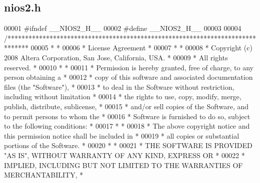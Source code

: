\subsection{nios2.\+h}
\label{nios2_8h_source}

\begin{DoxyCode}
00001 \textcolor{preprocessor}{#ifndef \_\_NIOS2\_H\_\_}
00002 \textcolor{preprocessor}{#define \_\_NIOS2\_H\_\_}
00003 
00004 \textcolor{comment}{/******************************************************************************}
00005 \textcolor{comment}{*                                                                             *}
00006 \textcolor{comment}{* License Agreement                                                           *}
00007 \textcolor{comment}{*                                                                             *}
00008 \textcolor{comment}{* Copyright (c) 2008 Altera Corporation, San Jose, California, USA.           *}
00009 \textcolor{comment}{* All rights reserved.                                                        *}
00010 \textcolor{comment}{*                                                                             *}
00011 \textcolor{comment}{* Permission is hereby granted, free of charge, to any person obtaining a     *}
00012 \textcolor{comment}{* copy of this software and associated documentation files (the "Software"),  *}
00013 \textcolor{comment}{* to deal in the Software without restriction, including without limitation   *}
00014 \textcolor{comment}{* the rights to use, copy, modify, merge, publish, distribute, sublicense,    *}
00015 \textcolor{comment}{* and/or sell copies of the Software, and to permit persons to whom the       *}
00016 \textcolor{comment}{* Software is furnished to do so, subject to the following conditions:        *}
00017 \textcolor{comment}{*                                                                             *}
00018 \textcolor{comment}{* The above copyright notice and this permission notice shall be included in  *}
00019 \textcolor{comment}{* all copies or substantial portions of the Software.                         *}
00020 \textcolor{comment}{*                                                                             *}
00021 \textcolor{comment}{* THE SOFTWARE IS PROVIDED "AS IS", WITHOUT WARRANTY OF ANY KIND, EXPRESS OR  *}
00022 \textcolor{comment}{* IMPLIED, INCLUDING BUT NOT LIMITED TO THE WARRANTIES OF MERCHANTABILITY,    *}

\end{DoxyCode}
